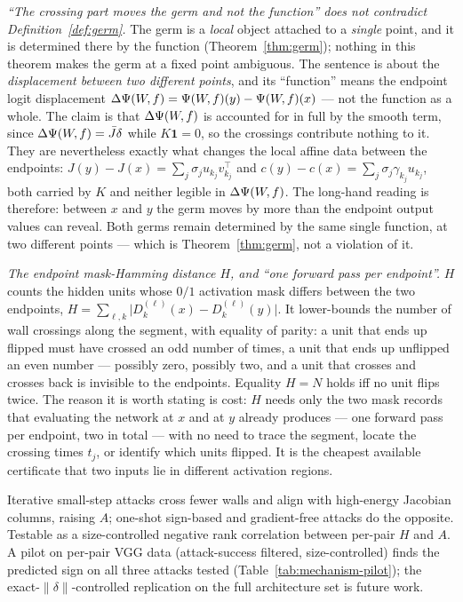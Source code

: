 \begin{clarifybox}
\emph{``The crossing part moves the germ and not the function'' does not
contradict Definition~\ref{def:germ}.} The germ is a \emph{local} object
attached to a \emph{single} point, and it is determined there by the function
(Theorem~\ref{thm:germ}); nothing in this theorem makes the germ at a fixed
point ambiguous. The sentence is about the \emph{displacement between two
different points}, and its ``function'' means the endpoint logit displacement
$\Delta\Psi(W\!,f)=\Psi(W\!,f)(y)-\Psi(W\!,f)(x)$ --- not the function as a whole. The claim is that
$\Delta\Psi(W\!,f)$ is accounted for in full by the smooth term, since
$\Delta\Psi(W\!,f)=\bar J\delta$ while $K\mathbf 1=0$, so the crossings contribute
nothing to it. They are nevertheless exactly what changes the local affine
data between the endpoints: $J(y)-J(x)=\sum_j\sigma_ju_{k_j}v_{k_j}^{\top}$
and $c(y)-c(x)=\sum_j\sigma_j\gamma_{k_j}u_{k_j}$, both carried by $K$ and
neither legible in $\Delta\Psi(W\!,f)$. The long-hand reading is therefore: between $x$
and $y$ the germ moves by more than the endpoint output values can reveal.
Both germs remain determined by the same single function, at two different
points --- which is Theorem~\ref{thm:germ}, not a violation of it.
\end{clarifybox}

\begin{clarifybox}
\emph{The endpoint mask-Hamming distance $H$, and ``one forward pass per
endpoint''.} $H$ counts the hidden units whose $0/1$ activation mask differs
between the two endpoints,
$H=\sum_{\ell,k}\bigl|D^{(\ell)}_k(x)-D^{(\ell)}_k(y)\bigr|$. It lower-bounds
the number of wall crossings along the segment, with equality of parity: a
unit that ends up flipped must have crossed an odd number of times, a unit
that ends up unflipped an even number --- possibly zero, possibly two, and a
unit that crosses and crosses back is invisible to the endpoints. Equality
$H=N$ holds iff no unit flips twice. The reason it is worth stating is cost:
$H$ needs only the two mask records that evaluating the network at $x$ and at
$y$ already produces --- one forward pass per endpoint, two in total --- with
no need to trace the segment, locate the crossing times $t_j$, or identify
which units flipped. It is the cheapest available certificate that two inputs
lie in different activation regions.
\end{clarifybox}

\begin{conjecture}\label{conj:mechanism}
Iterative small-step attacks cross fewer walls and align with high-energy
Jacobian columns, raising $A$; one-shot sign-based and gradient-free attacks
do the opposite. Testable as a size-controlled negative rank correlation
between per-pair $H$ and $A$. A pilot on per-pair VGG data (attack-success
filtered, size-controlled) finds the predicted sign on all three attacks
tested (Table~\ref{tab:mechanism-pilot}); the exact-$\|\delta\|$-controlled
replication on the full architecture set is future work.
\end{conjecture}

